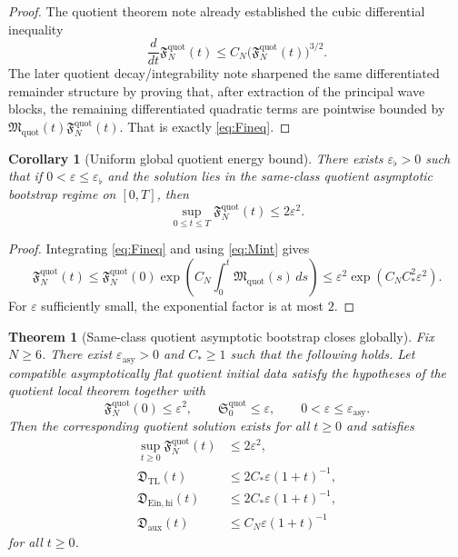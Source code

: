 \documentclass[11pt]{article}
\newtheorem{corollary}{Corollary}
\newtheorem{theorem}{Theorem}
\begin{document}
\begin{proof}
The quotient theorem note already established the cubic differential inequality
\[
\frac{d}{dt}\mathfrak F_N^{\mathrm{quot}}(t)
\le
C_N\bigl(\mathfrak F_N^{\mathrm{quot}}(t)\bigr)^{3/2}.
\]
The later quotient decay/integrability note sharpened the same differentiated remainder structure by proving that, after extraction of the principal wave blocks, the remaining differentiated quadratic terms are pointwise bounded by \(\mathfrak M_{\mathrm{quot}}(t)\mathfrak F_N^{\mathrm{quot}}(t)\). That is exactly \eqref{eq:Fineq}.
\end{proof}

\begin{corollary}[Uniform global quotient energy bound]
\label{cor:Fglobal}
There exists \(\varepsilon_\flat>0\) such that if \(0<\varepsilon\le \varepsilon_\flat\) and the solution lies in the same-class quotient asymptotic bootstrap regime on \([0,T]\), then
\begin{equation}
\sup_{0\le t\le T}\mathfrak F_N^{\mathrm{quot}}(t)\le 2\varepsilon^2.
\label{eq:Fglobal}
\end{equation}
\end{corollary}

\begin{proof}
Integrating \eqref{eq:Fineq} and using \eqref{eq:Mint} gives
\[
\mathfrak F_N^{\mathrm{quot}}(t)
\le
\mathfrak F_N^{\mathrm{quot}}(0)
\exp\!\left(C_N\int_0^t \mathfrak M_{\mathrm{quot}}(s)\,ds\right)
\le
\varepsilon^2\exp(C_NC_\ast^2\varepsilon^2).
\]
For \(\varepsilon\) sufficiently small, the exponential factor is at most \(2\).
\end{proof}

\begin{theorem}[Same-class quotient asymptotic bootstrap closes globally]
\label{thm:global}
Fix \(N\ge 6\). There exist \(\varepsilon_{\mathrm{asy}}>0\) and \(C_\ast\ge 1\) such that the following holds. Let compatible asymptotically flat quotient initial data satisfy the hypotheses of the quotient local theorem together with
\begin{equation}
\mathfrak F_N^{\mathrm{quot}}(0)\le \varepsilon^2,
\qquad
\mathfrak S_0^{\mathrm{quot}}\le \varepsilon,
\qquad
0<\varepsilon\le \varepsilon_{\mathrm{asy}}.
\label{eq:smallasy}
\end{equation}
Then the corresponding quotient solution exists for all \(t\ge 0\) and satisfies
\begin{align}
\sup_{t\ge 0}\mathfrak F_N^{\mathrm{quot}}(t)
&\le 2\varepsilon^2,
\label{eq:globalF}
\\
\mathfrak D_{\mathrm{TL}}(t)
&\le
2C_\ast\varepsilon(1+t)^{-1},
\label{eq:globalTL}
\\
\mathfrak D_{\mathrm{Ein,hi}}(t)
&\le
2C_\ast\varepsilon(1+t)^{-1},
\label{eq:globalEin}
\\
\mathfrak D_{\mathrm{aux}}(t)
&\le
C_N\varepsilon(1+t)^{-1}
\label{eq:globalaux}
\end{align}
for all \(t\ge 0\).
\end{theorem}
\end{document}
